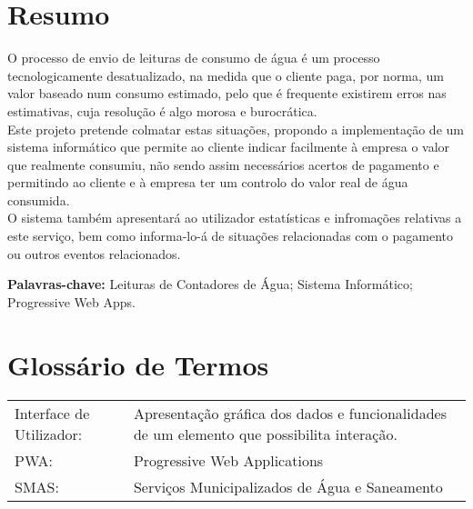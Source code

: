 \documentclass[a4paper,openright,twoside,11pt]{report}
\begin{document}
\chapter*{Resumo}
O processo de envio de leituras de consumo de água é um processo tecnologicamente desatualizado, na medida que o cliente paga, por norma, um valor baseado num consumo estimado, pelo que é frequente existirem erros nas estimativas, cuja resolução é algo morosa e burocrática.\\
Este projeto pretende colmatar estas situações, propondo a implementação de um sistema informático que permite ao cliente indicar facilmente à empresa o valor que realmente consumiu, não sendo assim necessários acertos de pagamento e permitindo ao cliente e à empresa ter um controlo do valor real de água consumida.\\
O sistema também apresentará ao utilizador estatísticas e infromações relativas a este serviço, bem como informa-lo-á de situações relacionadas com o pagamento ou outros eventos relacionados.
\vspace{1.5cm}

{\bf Palavras-chave:} Leituras de Contadores de Água; Sistema Informático; Progressive Web Apps.

\cleardoublepage %
\chapter*{Glossário de Termos}

\begin{tabular}[l]{l  p{11cm}} 

Interface de Utilizador: & Apresentação gráfica dos dados e funcionalidades de um elemento que possibilita interação.\\ 

PWA:  & Progressive Web Applications\\

SMAS: & Serviços Municipalizados de Água e Saneamento\\

\end{tabular}
\label{tab:req_utilizador}

\end{document}

